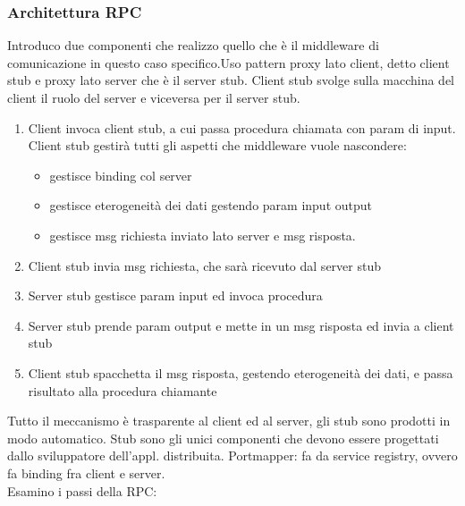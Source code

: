 \documentclass[16px]{article}
\begin{document}
\subsubsection{Architettura RPC}
Introduco due componenti che realizzo quello che è il middleware di comunicazione in questo caso specifico.Uso pattern proxy lato client, detto client stub e proxy lato server che è il server stub. Client stub svolge sulla macchina del client il ruolo del server e viceversa per il server stub.
\begin{enumerate}
\item Client invoca client stub, a cui passa procedura chiamata con param di input. Client stub gestirà tutti gli aspetti che middleware vuole nascondere:
\begin{itemize}
\item gestisce binding col server
\item gestisce eterogeneità dei dati gestendo param input output
\item gestisce msg richiesta inviato lato server e msg risposta.
\end{itemize}
\item Client stub invia msg richiesta, che sarà ricevuto dal server stub
\item Server stub gestisce param input ed invoca procedura
\item Server stub prende param output e mette in un msg risposta ed invia a client stub
\item Client stub spacchetta il msg risposta, gestendo eterogeneità dei dati, e passa risultato alla procedura chiamante
\end{enumerate}
Tutto il meccanismo è trasparente al client ed al server, gli stub sono prodotti in modo automatico. Stub sono gli unici componenti che devono essere progettati dallo sviluppatore dell'appl. distribuita. Portmapper: fa da service registry, ovvero fa binding fra client e server.\\ Esamino i passi della RPC:
\end{document}
